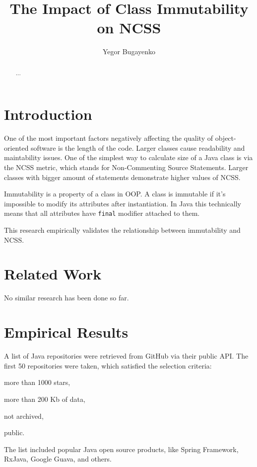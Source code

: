 \documentclass[a4paper,UKenglish,cleveref, autoref]{lipics-v2019}
\title{The Impact of Class Immutability on NCSS}
\author{Yegor Bugayenko}
  {Huawei Technologies Co., Ltd.}
  {Russian Research Institute (RRI)}{Moscow, Russia}{yegor.bugayenko@huawei.com}
\begin{document}
\maketitle

\begin{abstract}
...
\end{abstract}

\section{Introduction}

One of the most important factors negatively affecting the quality
of object-oriented software is the length of the code. Larger classes
cause readability and maintability issues. One of the simplest way
to calculate size of a Java class is via the NCSS metric, which
stands for Non-Commenting Source Statements. Larger classes with bigger
amount of statements demonstrate higher values of NCSS.

Immutability is a property of a class in OOP. A class is immutable if
it's impossible to modify its attributes after instantiation. In Java this
technically means that all attributes have \texttt{final} modifier attached
to them.

This research empirically validates the relationship between immutability
and NCSS.

\section{Related Work}

No similar research has been done so far.

\section{Empirical Results}

A list of Java repositories were retrieved from GitHub via their
public API. The first 50 repositories were taken, which satisfied
the selection criteria:
\begin{enumerate*}[label={\arabic*)}]
\item more than 1000 stars,
\item more than 200 Kb of data,
\item not archived,
\item public.
\end{enumerate*}
The list included popular Java open source products, like
Spring Framework, RxJava, Google Guava, and others.
\end{document}
